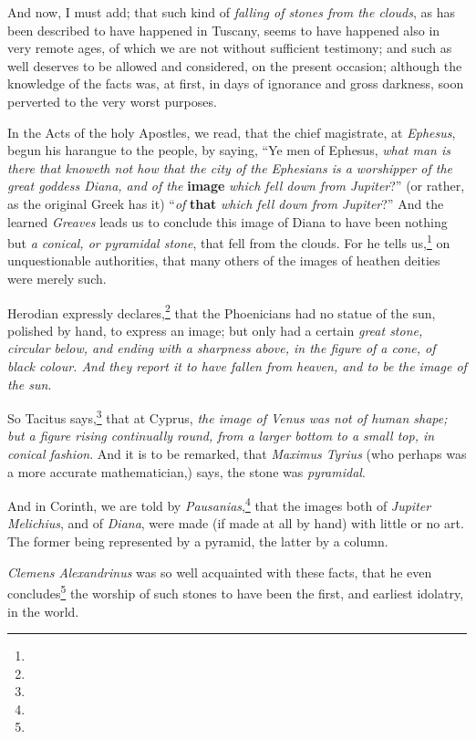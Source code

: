\documentclass[a4paper, 12pt, oneside, twocolumn]{article}
\begin{document}
And now, I must add; that such kind of \emph{falling of stones from the clouds}, as has been described to have happened in Tuscany, seems to have happened also in very remote ages, of which we are not without sufficient testimony; and such as well deserves to be allowed and considered, on the present occasion; although the knowledge of the facts was, at first, in days of ignorance and gross darkness, soon perverted to the very worst purposes.

In the Acts of the holy Apostles, we read, that the chief magistrate, at \emph{Ephesus}, begun his harangue to the people, by saying, ``Ye men of Ephesus, \emph{what man is there that knoweth not how that the city of the Ephesians is a worshipper of the great goddess Diana, and of the} \textbf{image} \emph{which fell down from Jupiter}?'' (or rather, as the original Greek has it) ``\emph{of} \textbf{that} \emph{which fell down from Jupiter}?'' And the learned \emph{Greaves} leads us to conclude this image of Diana to have been nothing but \emph{a conical, or pyramidal stone}, that fell from the clouds. For he tells us,\footnote{} on unquestionable authorities, that many others of the images of heathen deities were merely such.

Herodian expressly declares,\footnote{} that the Phoenicians had no statue of the sun, polished by hand, to express an image; but only had a certain \emph{great stone, circular below, and ending with a sharpness above, in the figure of a cone, of black colour. And they report it to have fallen from heaven, and to be the image of the sun}.

So Tacitus says,\footnote{} that at Cyprus, \emph{the image of Venus was not of human shape; but a figure rising continually round, from a larger bottom to a small top, in conical fashion}. And it is to be remarked, that \emph{Maximus Tyrius} (who perhaps was a more accurate mathematician,) says, the stone was \emph{pyramidal}.

And in Corinth, we are told by \emph{Pausanias},\footnote{} that the images both of \emph{Jupiter Melichius}, and of \emph{Diana}, were made (if made at all by hand) with little or no art. The former being represented by a pyramid, the latter by a column.

\emph{Clemens Alexandrinus} was so well acquainted with these facts, that he even concludes\footnote{} the worship of such stones to have been the first, and earliest idolatry, in the world.
\end{document}
